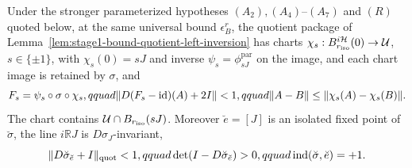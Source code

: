 \begin{lemma}\label{lem:stage1-bound-quotient-local-index}
Under the stronger parameterized hypotheses $(A_2),(A_4)$--$(A_7)$ and $(R)$ quoted below,
at the same universal bound $\epsilon_B^r$, the quotient package of
Lemma~\ref{lem:stage1-bound-quotient-left-inversion} has charts
$\chi_s:B^{i\mathcal H}_{r_{\mathrm{iso}}}(0)\to\mathcal U$, $s\in\{\pm1\}$, with $\chi_s(0)=sJ$ and inverse $\psi_s=\phi_{sJ}^{\mathrm{par}}$ on the image, and each chart image is retained by $\sigma$, and
\[
 F_s=\psi_s\circ\sigma\circ\chi_s,qquad
 \lVert D(F_s-\mathrm{id})(A)+2I\rVert<1,qquad
 \lVert A-B\rVert\le\lVert \chi_s(A)-\chi_s(B)\rVert.
\]
The chart contains $\mathcal U\cap B_{r_{\mathrm{iso}}}(sJ)$.  Moreover $\breve e=[J]$ is an
isolated fixed point of $\breve\sigma$, the line $i\mathbb R J$ is
$D\sigma_J$-invariant,
\[
 \lVert D\breve\sigma_{\breve e}+I\rVert_{\mathrm{quot}}<1,qquad
 \det(I-D\breve\sigma_{\breve e})>0,qquad
 \operatorname{ind}(\breve\sigma,\breve e)=+1.
\]
\end{lemma}

